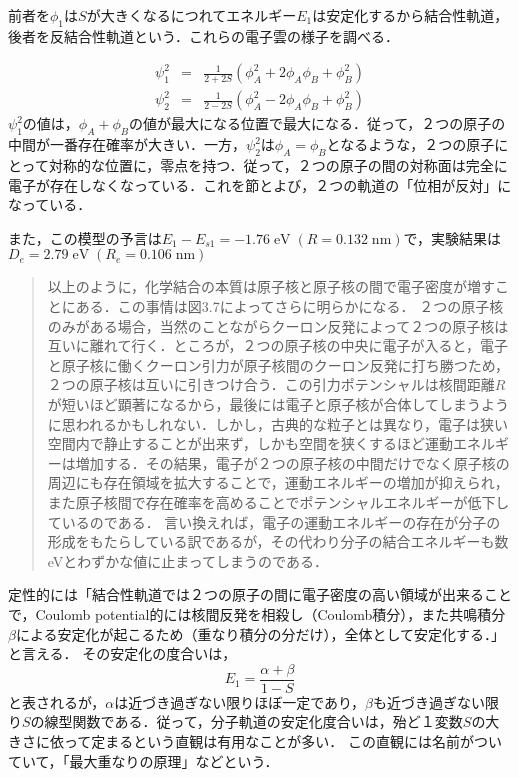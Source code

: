\documentclass[uplatex, dvipdfmx]{jsreport}
\begin{document}
\begin{example}
    前者を$\phi_1$は$S$が大きくなるにつれてエネルギー$E_1$は安定化するから結合性軌道，後者を反結合性軌道という．これらの電子雲の様子を調べる．

    \begin{eqnarray*}
        \psi_1^2 &=& \frac{1}{2+2S}(\phi_A^2+2\phi_A\phi_B+\phi_B^2) \\
        \psi_2^2 &=& \frac{1}{2-2S}(\phi_A^2-2\phi_A\phi_B+\phi_B^2)
    \end{eqnarray*}
    $\psi_1^2$の値は，$\phi_A+\phi_B$の値が最大になる位置で最大になる．従って，２つの原子の中間が一番存在確率が大きい．一方，$\psi_2^2$は$\phi_A=\phi_B$となるような，２つの原子にとって対称的な位置に，零点を持つ．従って，２つの原子の間の対称面は完全に電子が存在しなくなっている．これを節とよび，２つの軌道の「位相が反対」になっている．

    また，この模型の予言は$E_1-E_{s1}=-1.76\;\mathrm{eV}\;(R=0.132\;\mathrm{nm})$で，実験結果は$D_e=2.79\;\mathrm{eV}\;(R_e=0.106\;\mathrm{nm})$
\end{example}
\begin{remark}
    \begin{quotation}
        以上のように，化学結合の本質は原子核と原子核の間で電子密度が増すことにある．この事情は図3.7によってさらに明らかになる．
        ２つの原子核のみがある場合，当然のことながらクーロン反発によって２つの原子核は互いに離れて行く．ところが，２つの原子核の中央に電子が入ると，電子と原子核に働くクーロン引力が原子核間のクーロン反発に打ち勝つため，２つの原子核は互いに引きつけ合う．この引力ポテンシャルは核間距離$R$が短いほど顕著になるから，最後には電子と原子核が合体してしまうように思われるかもしれない．しかし，古典的な粒子とは異なり，電子は狭い空間内で静止することが出来ず，しかも空間を狭くするほど運動エネルギーは増加する．その結果，電子が２つの原子核の中間だけでなく原子核の周辺にも存在領域を拡大することで，運動エネルギーの増加が抑えられ，また原子核間で存在確率を高めることでポテンシャルエネルギーが低下しているのである．
        言い換えれば，電子の運動エネルギーの存在が分子の形成をもたらしている訳であるが，その代わり分子の結合エネルギーも数eVとわずかな値に止まってしまうのである．
    \end{quotation}
\end{remark}
\begin{screen}
    定性的には「結合性軌道では２つの原子の間に電子密度の高い領域が出来ることで，Coulomb potential的には核間反発を相殺し（Coulomb積分），また共鳴積分$\beta$による安定化が起こるため（重なり積分の分だけ），全体として安定化する．」と言える．
    その安定化の度合いは，
    \[E_1=\frac{\alpha+\beta}{1-S}\]
    と表されるが，$\alpha$は近づき過ぎない限りほぼ一定であり，$\beta$も近づき過ぎない限り$S$の線型関数である．従って，分子軌道の安定化度合いは，殆ど１変数$S$の大きさに依って定まるという直観は有用なことが多い．
    この直観には名前がついていて，「最大重なりの原理」などという．
\end{screen}
\end{document}
